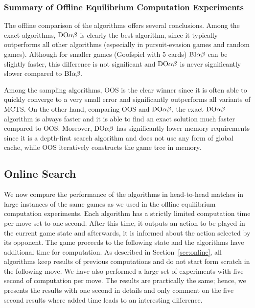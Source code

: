 \subsubsection{Summary of Offline Equilibrium Computation Experiments}

The offline comparison of the algorithms offers several conclusions.
Among the exact algorithms, $\textrm{DO}\alpha\beta$ is clearly the best algorithm, since it typically outperforms all other algorithms (especially in pursuit-evasion games and random games). Although for smaller games (\eg Goofspiel with $5$ cards)  $\textrm{BI}\alpha\beta$ can be slightly faster, this difference is not significant and $\textrm{DO}\alpha\beta$ is never significantly slower compared to $\textrm{BI}\alpha\beta$.

Among the sampling algorithms, OOS is the clear winner since it is often able to quickly converge to a very small error and significantly outperforms all variants of MCTS.
On the other hand, comparing OOS and $\textrm{DO}\alpha\beta$, the exact $\textrm{DO}\alpha\beta$ algorithm is always faster and it is able to find an exact solution much faster compared to OOS.
Moreover, $\textrm{DO}\alpha\beta$ has significantly lower memory requirements since it is a depth-first search algorithm and does not use any form of global cache, while OOS iteratively constructs the game tree in memory.

\subsection{Online Search}

We now compare the performance of the algorithms in head-to-head matches in large instances of the same games as we used in the offline equilibrium computation experiments. Each algorithm has a strictly limited computation time per move set to one second.  After this time, it outputs an action to be played in the current game state and afterwards, it is informed about the action selected by its opponent. The game proceeds to the following state and the algorithms have additional time for computation. As described in Section~\ref{sec:online}, all algorithms keep results of previous computations and do not start form scratch in the following move. We have also performed a large set of experiments with five second of computation per move. The results are practically the same; hence, we presents the results with one second in details and only comment on the five second results where added time leads to an interesting difference.

